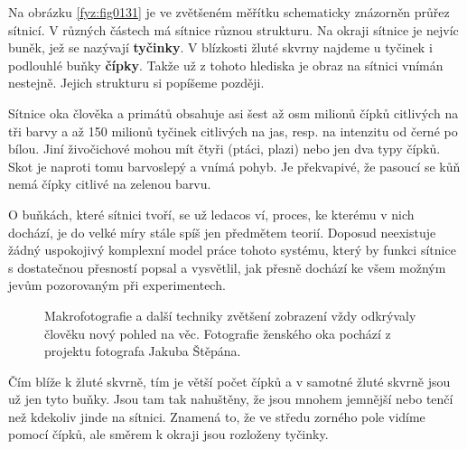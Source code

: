     Na obrázku \ref{fyz:fig0131} je ve zvětšeném měřítku schematicky znázorněn průřez sítnicí. V
    různých částech má sítnice různou strukturu. Na okraji sítnice je nejvíc buněk, jež se nazývají
    \textbf{tyčinky}. V blízkosti žluté skvrny najdeme u tyčinek i podlouhlé buňky \textbf{čípky}.
    Takže už z tohoto hlediska je obraz na sítnici vnímán nestejně. Jejich strukturu si popíšeme
    později. 
    
    
    Sítnice oka člověka a primátů obsahuje asi šest až osm milionů čípků citlivých na tři barvy a až
    150 milionů tyčinek citlivých na jas, resp. na intenzitu od černé po bílou. Jiní živočichové
    mohou mít čtyři (ptáci, plazi) nebo jen dva typy čípků. Skot je naproti tomu barvoslepý a vnímá
    pohyb. Je překvapivé, že pasoucí se kůň nemá čípky citlivé na zelenou barvu.

    O buňkách, které sítnici tvoří, se už ledacos ví, proces, ke kterému v nich dochází, je do velké
    míry stále spíš jen předmětem teorií. Doposud neexistuje žádný uspokojivý komplexní model práce
    tohoto systému, který by funkci sítnice s dostatečnou přesností popsal a vysvětlil, jak přesně
    dochází ke všem možným jevům pozorovaným při experimentech.
    
    \begin{figure*}[ht!] %
      \centering
      \caption{Makrofotografie a další techniky zvětšení zobrazení vždy odkrývaly člověku nový
              pohled na věc. Fotografie ženského oka pochází z projektu \HumanEye fotografa Jakuba
              Štěpána.}
      \label{fyz:fig0920}
    \end{figure*}

    Čím blíže k žluté skvrně, tím je větší počet čípků a v samotné žluté skvrně jsou už jen tyto
    buňky. Jsou tam tak nahuštěny, že jsou mnohem jemnější nebo tenčí než kdekoliv jinde na sítnici.
    Znamená to, že ve středu zorného pole vidíme pomocí čípků, ale směrem k okraji jsou rozloženy
    tyčinky. 
    
